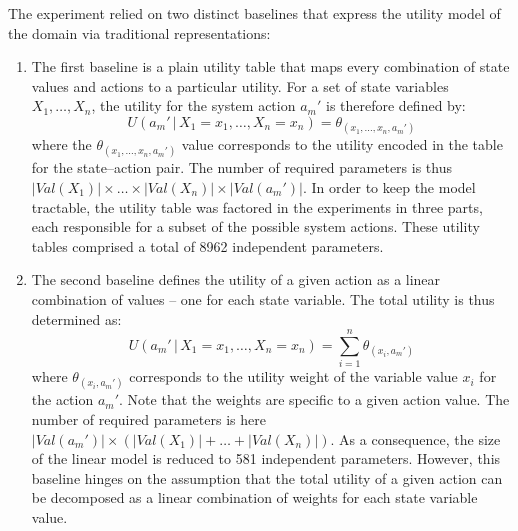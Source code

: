 The experiment relied on two distinct baselines that express the utility model of the domain via traditional representations: \begin{enumerate}
\item The first baseline is a plain utility table that maps every combination of state values and actions to a particular utility.  For a set of state variables $X_1, \dots, X_n$, 
the utility for the system action $a_m'$ is therefore defined by: 
\begin{equation}
U(a_m' \, | \, X_1\!=\!x_1, \dots, X_n\!=\!x_n) = \theta_{(x_1, \dots, x_n, a_m')}
\end{equation}
where the $\theta_{(x_1, \dots, x_n, a_m')}$ value corresponds to the utility encoded in the table for the state--action pair. The number of required parameters is thus $|\mathit{Val}(X_1)| \times \dots \times |\mathit{Val}(X_n)| \times |\mathit{Val}(a_m')|$. In order to keep the model tractable, the utility table was factored in the experiments in three parts, each responsible for a subset of the possible system actions. These utility tables comprised a total of 8962 independent parameters. 
\item The second baseline defines the utility of a given action as a linear combination of values -- one for each state variable.  The total utility is thus determined as:
\begin{equation}
U(a_m' \, | \, X_1\!=\!x_1, \dots, X_n\!=\!x_n) = \sum_{i=1}^{n} \theta_{(x_i, a_m')}
\end{equation}
where $\theta_{(x_i, a_m')}$ corresponds to the utility weight of the variable value $x_i$ for the action $a_m'$.  Note that the weights are specific to a given action value. The number of required parameters is here $|\mathit{Val}(a_m')| \times (|\mathit{Val}(X_1)| + \dots + |\mathit{Val}(X_n)|)$.  As a consequence, the size of the linear model is reduced to 581 independent parameters.  However, this baseline hinges on the assumption that the total utility of a given action can be decomposed as a linear combination of weights for each state variable value.
\end{enumerate}

